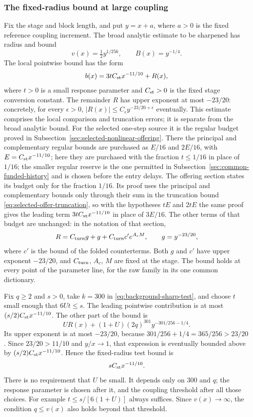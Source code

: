 \subsubsection{The fixed-radius bound at large coupling}
Fix the stage and block length, and put $y=x+a$, where $a>0$
is the fixed reference coupling increment. The broad analytic
estimate to be sharpened has radius and bound
\[
                 v(x)=\tfrac12 y^{1/256},\qquad B(x)=y^{-1/4}.
\]
The local pointwise bound has the form
\[
             b(x)=3t C_{\rm st}x^{-11/10}+R(x),
\]
where $t>0$ is a small response parameter and $C_{\rm st}>0$
is the fixed stage conversion constant. The remainder $R$ has
upper exponent at most $-23/20$: concretely, for every
$\epsilon>0$, $|R(x)|\le C_\epsilon y^{-23/20+\epsilon}$
eventually. This estimate comprises the local comparison and
truncation errors; it is separate from the broad analytic bound.
For the selected one-step source it is the regular budget proved in
Subsection~\ref{sec:selected-nonlinear-offering}. There the principal
and complementary regular bounds are purchased as $E/16$ and
$2E/16$, with $E=C_{\rm st}x^{-11/10}$; here they are purchased with
the fraction $t\le1/16$ in place of $1/16$; the smaller regular
reserve is the one permitted in
Subsection~\ref{sec:common-funded-history} and is chosen before the
entry delays. The offering section states its budget only for the
fraction $1/16$. Its proof uses the principal and complementary
bounds only through their sum in the truncation bound
\eqref{eq:selected-offer-truncation}, so with the hypotheses $tE$
and $2tE$ the same proof gives the leading term
$3tC_{\rm st}x^{-11/10}$ in place of $3E/16$. The other terms of
that budget are unchanged: in the notation of that section,
\[
          R=C_{\rm turn}g+g+C_{\rm turn}c'e^{A_cM},
          \qquad g=y^{-23/20},
\]
where $c'$ is the bound of the folded counterterms. Both $g$ and
$c'$ have upper exponent $-23/20$, and $C_{\rm turn}$, $A_c$, $M$
are fixed at the stage. The bound holds at every point of the
parameter line, for the raw family in its one common dictionary.

Fix $q\ge2$ and $s>0$, take $k=300$ in
\eqref{eq:background-sharp-test}, and choose $t$ small enough that
$6Ut\le s$. The leading pointwise contribution is at most
$(s/2)C_{\rm st}x^{-11/10}$. The other part of the bound is
\[
 UR(x)+(1+U)(2q)^{301}y^{-301/256-1/4}.
\]
Its upper exponent is at most $-23/20$, because
$301/256+1/4=365/256>23/20$. Since $23/20>11/10$
and $y/x\to1$, that expression is eventually bounded above by
$(s/2)C_{\rm st}x^{-11/10}$. Hence the fixed-radius test bound is
\begin{equation}\label{eq:background-pre-reset-price}
                         sC_{\rm st}x^{-11/10}.
\end{equation}
There is no requirement that $U$ be small. It depends only on
$300$ and $q$; the response parameter is chosen after it, and the
coupling threshold after all those choices. For example
$t\le s/[6(1+U)]$ always suffices. Since $v(x)\to\infty$,
the condition $q\le v(x)$ also holds beyond that threshold.

